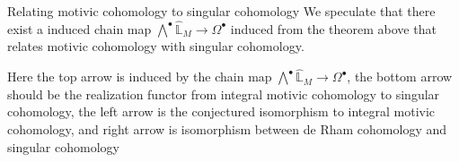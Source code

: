 \documentclass[8pt]{beamer}
\theoremstyle{definition}
\theoremstyle{remark}
\begin{document}
\begin{frame}[t]{Relating motivic cohomology to singular cohomology}
We speculate that there exist a induced chain map $\bigwedge^\bullet\widehat{\mathbb L}_M\to\Omega^\bullet$ induced from the theorem above that relates motivic cohomology with singular cohomology.

\begin{center}
\end{center}

Here the top arrow is induced by the chain map $\bigwedge^\bullet\widehat{\mathbb L}_M\to\Omega^\bullet$, the bottom arrow should be the realization functor from integral motivic cohomology to singular cohomology, the left arrow is the conjectured isomorphism to integral motivic cohomology, and right arrow is isomorphism between de Rham cohomology and singular cohomology
\end{frame}
\end{document}
